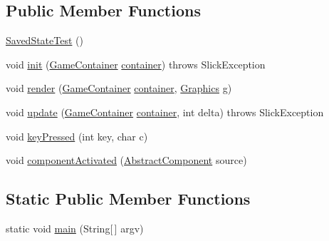 \subsection*{Public Member Functions}
\begin{DoxyCompactItemize}
\item 
\mbox{\hyperlink{classorg_1_1newdawn_1_1slick_1_1tests_1_1_saved_state_test_ade9f1662a9e9aa0eb5813da099b66875}{Saved\+State\+Test}} ()
\item 
void \mbox{\hyperlink{classorg_1_1newdawn_1_1slick_1_1tests_1_1_saved_state_test_afe29a8dbe96c8294453f8124f19534e3}{init}} (\mbox{\hyperlink{classorg_1_1newdawn_1_1slick_1_1_game_container}{Game\+Container}} \mbox{\hyperlink{classorg_1_1newdawn_1_1slick_1_1tests_1_1_saved_state_test_ad6f5870be107273edb69949feace3400}{container}})  throws Slick\+Exception 
\item 
void \mbox{\hyperlink{classorg_1_1newdawn_1_1slick_1_1tests_1_1_saved_state_test_ab3ea87bf5968c4558ddc3d884fd82bb1}{render}} (\mbox{\hyperlink{classorg_1_1newdawn_1_1slick_1_1_game_container}{Game\+Container}} \mbox{\hyperlink{classorg_1_1newdawn_1_1slick_1_1tests_1_1_saved_state_test_ad6f5870be107273edb69949feace3400}{container}}, \mbox{\hyperlink{classorg_1_1newdawn_1_1slick_1_1_graphics}{Graphics}} g)
\item 
void \mbox{\hyperlink{classorg_1_1newdawn_1_1slick_1_1tests_1_1_saved_state_test_a8579e572ac2db1c292660cdd79f26887}{update}} (\mbox{\hyperlink{classorg_1_1newdawn_1_1slick_1_1_game_container}{Game\+Container}} \mbox{\hyperlink{classorg_1_1newdawn_1_1slick_1_1tests_1_1_saved_state_test_ad6f5870be107273edb69949feace3400}{container}}, int delta)  throws Slick\+Exception 
\item 
void \mbox{\hyperlink{classorg_1_1newdawn_1_1slick_1_1tests_1_1_saved_state_test_a5346d649eaa7968826fca86eaf86ca3f}{key\+Pressed}} (int key, char c)
\item 
void \mbox{\hyperlink{classorg_1_1newdawn_1_1slick_1_1tests_1_1_saved_state_test_ab9537e69e7a620ccb73d75f6ace818c5}{component\+Activated}} (\mbox{\hyperlink{classorg_1_1newdawn_1_1slick_1_1gui_1_1_abstract_component}{Abstract\+Component}} source)
\end{DoxyCompactItemize}
\subsection*{Static Public Member Functions}
\begin{DoxyCompactItemize}
\item 
static void \mbox{\hyperlink{classorg_1_1newdawn_1_1slick_1_1tests_1_1_saved_state_test_aecb09abf8d907edee1f78c0db6d66f8f}{main}} (String\mbox{[}$\,$\mbox{]} argv)
\end{DoxyCompactItemize}
